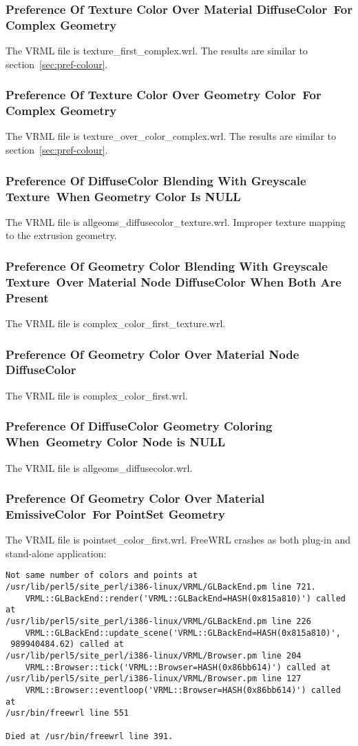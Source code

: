 \documentclass[12pt,letterpaper]{article}
\newcommand{\MatHa}{Preference Of Texture Color Over Material DiffuseColor~}
\newcommand{\MatHb}{For Complex Geometry}
\newcommand{\MatIa}{Preference Of Texture Color Over Geometry Color~}
\newcommand{\MatIb}{For Complex Geometry}
\newcommand{\MatJa}{Preference Of DiffuseColor Blending With Greyscale Texture~}
\newcommand{\MatJb}{When Geometry Color Is NULL}
\newcommand{\MatKa}{Preference Of Geometry Color Blending With Greyscale Texture~}
\newcommand{\MatKb}{Over Material Node DiffuseColor When Both Are Present}
\newcommand{\MatL}{Preference Of Geometry Color Over Material Node DiffuseColor}
\newcommand{\MatMa}{Preference Of DiffuseColor Geometry Coloring When~}
\newcommand{\MatMb}{Geometry Color Node is NULL}
\newcommand{\MatNa}{Preference Of Geometry Color Over Material EmissiveColor~}
\newcommand{\MatNb}{For PointSet Geometry}
\begin{document}
\subsubsection{\MatHa\MatHb}
The VRML file is texture\_first\_complex.wrl.\newline
The results are similar to section~\ref{sec:pref-colour}.

\subsubsection{\MatIa\MatIb}
The VRML file is texture\_over\_color\_complex.wrl.\newline
The results are similar to section~\ref{sec:pref-colour}.

\subsubsection{\MatJa\MatJb}
The VRML file is allgeoms\_diffusecolor\_texture.wrl.\newline
Improper texture mapping to the extrusion geometry.

\subsubsection{\MatKa\MatKb}
The VRML file is complex\_color\_first\_texture.wrl.

\subsubsection{\MatL}
The VRML file is complex\_color\_first.wrl.

\subsubsection{\MatMa\MatMb}
The VRML file is allgeoms\_diffusecolor.wrl.

\subsubsection{\MatNa\MatNb}
The VRML file is pointset\_color\_first.wrl.\newline
FreeWRL crashes as both plug-in and stand-alone application:
\begin{verbatim}
Not same number of colors and points at
/usr/lib/perl5/site_perl/i386-linux/VRML/GLBackEnd.pm line 721.
    VRML::GLBackEnd::render('VRML::GLBackEnd=HASH(0x815a810)') called at
/usr/lib/perl5/site_perl/i386-linux/VRML/GLBackEnd.pm line 226
    VRML::GLBackEnd::update_scene('VRML::GLBackEnd=HASH(0x815a810)',
 989940484.62) called at
/usr/lib/perl5/site_perl/i386-linux/VRML/Browser.pm line 204
    VRML::Browser::tick('VRML::Browser=HASH(0x86bb614)') called at
/usr/lib/perl5/site_perl/i386-linux/VRML/Browser.pm line 127
    VRML::Browser::eventloop('VRML::Browser=HASH(0x86bb614)') called at
/usr/bin/freewrl line 551

Died at /usr/bin/freewrl line 391.
\end{verbatim}
\end{document}
